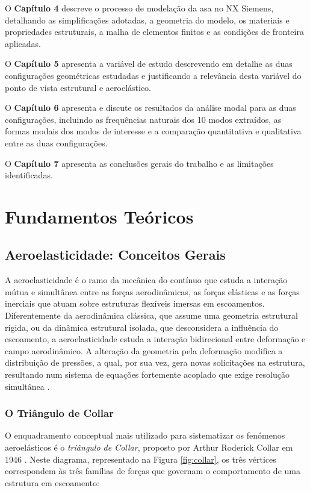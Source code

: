 \documentclass[11pt,oneside,a4paper,final]{report}
\begin{document}
O \textbf{Capítulo 4} descreve o processo de modelação da asa no NX Siemens, detalhando as simplificações adotadas, a geometria do modelo, os materiais e propriedades estruturais, a malha de elementos finitos e as condições de fronteira aplicadas.

O \textbf{Capítulo 5} apresenta a variável de estudo descrevendo em detalhe as duas configurações geométricas estudadas e justificando a relevância desta variável do ponto de vista estrutural e aeroelástico.

O \textbf{Capítulo 6} apresenta e discute os resultados da análise modal para as duas configurações, incluindo as frequências naturais dos 10 modos extraídos, as formas modais dos modos de interesse e a comparação quantitativa e qualitativa entre as duas configurações.

O \textbf{Capítulo 7} apresenta as conclusões gerais do trabalho e as limitações identificadas.

\chapter{Fundamentos Teóricos}
\label{chap:fundamentos}

\section{Aeroelasticidade: Conceitos Gerais}
\label{sec:aeroelasticidade}

A aeroelasticidade é o ramo da mecânica do contínuo que estuda a interação mútua e simultânea entre as forças aerodinâmicas, as forças elásticas e as forças inerciais que atuam sobre estruturas flexíveis imersas em escoamentos. Diferentemente da aerodinâmica clássica, que assume uma geometria estrutural rígida, ou da dinâmica estrutural isolada, que desconsidera a influência do escoamento, a aeroelasticidade estuda a interação bidirecional entre deformação e campo aerodinâmico. A alteração da geometria pela deformação modifica a distribuição de pressões, a qual, por sua vez, gera novas solicitações na estrutura, resultando num sistema de equações fortemente acoplado que exige resolução simultânea \cite{Bisplinghoff1996, Dowell2004}.

\subsection{O Triângulo de Collar}

O enquadramento conceptual mais utilizado para sistematizar os fenómenos aeroelásticos é o \textit{triângulo de Collar}, proposto por Arthur Roderick Collar em 1946 \cite{Collar1946}. Neste diagrama, representado na Figura \ref{fig:collar}, os três vértices correspondem às três famílias de forças que governam o comportamento de uma estrutura em escoamento:
\end{document}
